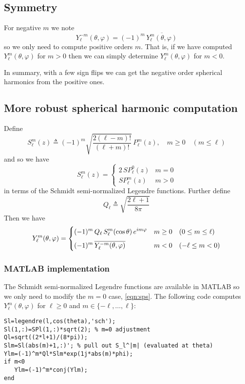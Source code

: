 \documentclass[a4paper,10pt]{article}
\newcommand{\dfn}{\triangleq}
\begin{document}
\subsection{Symmetry}

For negative $m$ we note
\[
	Y_{\ell}^{-m}(\theta,\varphi)=(-1)^{m}\,\overline{Y_{\ell}^{m}(\theta,\varphi)}
\]
so we only need to compute positive orders $m$.  That is, if we have computed $Y_{\ell}^{m}(\theta,\varphi)$ for $m>0$ then we can simply determine $Y_{\ell}^{m}(\theta,\varphi)$ for $m<0$.

In summary, with a few sign flips we can get the negative order spherical harmonics from the positive ones.

\subsection{More robust spherical harmonic computation}

Define
\[
	S_{\ell}^{m}(z)\dfn(-1)^{m}\sqrt{\frac{2(\ell-m)!}{(\ell+m)!}}\,
			P_{\ell}^{m}(z),\quad m\geq0\quad (m\leq\ell)
\]
and so we have
\begin{equation}
\label{eqn:sps}
	S_{\ell}^{m}(z)=
		\begin{cases}
			2\,S\!P_{\ell}^{0}(z) &m=0 \\[2mm]
			S\!P_{\ell}^{m}(z) &m>0
		\end{cases}
\end{equation}
in terms of the Schmidt semi-normalized Legendre functions. Further define
\[
	Q_{\ell}\dfn\sqrt{\frac{2\ell+1}{8\pi}}
\]
Then we have
\[
	Y_{\ell}^{m}(\theta,\varphi)=
		\begin{cases}
			\displaystyle
			(-1)^{m}\,Q_{\ell}\,
			S_{\ell}^{m}(\cos\theta)\,e^{im\varphi} &m\geq0\quad (0\leq m\leq\ell) \\[2mm]
			\displaystyle
			(-1)^{m}\,\overline{Y_{\ell}^{\smash{-m}}(\theta,\varphi)} &m<0\quad (-\ell\leq m<0)
		\end{cases}
\]

\subsubsection{MATLAB implementation}

The Schmidt semi-normalized Legendre functions are available in MATLAB so we only need to modify the $m=0$ case, \eqref{eqn:sps}.  The following code computes $Y_{\ell}^{m}(\theta,\varphi)$ for $\ell\geq0$ and $m\in\{-\ell,\dotsc,\ell\}$:
\color{blue}\begin{verbatim}
Sl=legendre(l,cos(theta),'sch');
Sl(1,:)=SPl(1,:)*sqrt(2); % m=0 adjustment
Ql=sqrt((2*l+1)/(8*pi));
Slm=Sl(abs(m)+1,:)'; % pull out S_l^|m| (evaluated at theta)
Ylm=(-1)^m*Ql*Slm*exp(1j*abs(m)*phi);
if m<0
   Ylm=(-1)^m*conj(Ylm);
end
\end{verbatim}\color{black}
\end{document}
